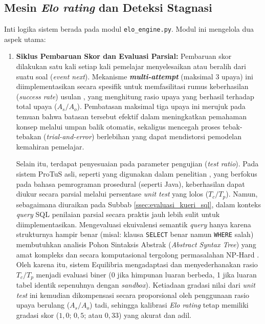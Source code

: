 \subsection{Mesin \textit{Elo rating} dan Deteksi Stagnasi}
Inti logika sistem berada pada modul \texttt{elo\_engine.py}. Modul ini mengelola dua aspek utama:
\begin{enumerate}
    \item \textbf{Siklus Pembaruan Skor dan Evaluasi Parsial:} Pembaruan skor dilakukan satu kali setiap kali pemelajar menyelesaikan atau beralih dari suatu soal (\textit{event next}). Mekanisme \textbf{\textit{multi-attempt}} (maksimal 3 upaya) ini diimplementasikan secara spesifik untuk memfasilitasi rumus keberhasilan (\textit{success rate}) usulan \textcite{Vesin2022}, yang menghitung rasio upaya yang berhasil terhadap total upaya ($A_s / A_o$). Pembatasan maksimal tiga upaya ini merujuk pada temuan \textcite{Mendoza2022} bahwa batasan tersebut efektif dalam meningkatkan pemahaman konsep melalui umpan balik otomatis, sekaligus mencegah proses tebak-tebakan (\textit{trial-and-error}) berlebihan yang dapat mendistorsi pemodelan kemahiran pemelajar.

    Selain itu, terdapat penyesuaian pada parameter pengujian (\textit{test ratio}). Pada sistem ProTuS asli, seperti yang digunakan dalam penelitian \textcite{Vesin2022}, yang berfokus pada bahasa pemrograman prosedural (seperti Java), keberhasilan dapat diukur secara parsial melalui persentase \textit{unit test} yang lolos ($T_c / T_p$). Namun, sebagaimana diuraikan pada Subbab \ref{ssec:evaluasi_kueri_sql}, dalam konteks \textit{query} SQL penilaian parsial secara praktis jauh lebih sulit untuk diimplementasikan. Mengevaluasi ekuivalensi semantik \textit{query} hanya karena strukturnya hampir benar (misal: klausa \texttt{SELECT} benar namun \texttt{WHERE} salah) membutuhkan analisis Pohon Sintaksis Abstrak (\textit{Abstract Syntax Tree}) yang amat kompleks dan secara komputasional tergolong permasalahan NP-Hard \autocite{Silberschatz2019}. Oleh karena itu, sistem Equilibria mengadaptasi dan menyederhanakan rasio $T_c / T_p$ menjadi evaluasi biner (0 jika himpunan luaran berbeda, 1 jika luaran tabel identik sepenuhnya dengan \textit{sandbox}). Ketiadaan gradasi nilai dari \textit{unit test} ini kemudian dikompensasi secara proporsional oleh penggunaan rasio upaya berulang ($A_s / A_o$) tadi, sehingga kalibrasi \textit{Elo rating} tetap memiliki gradasi skor ($1,0$; $0,5$; atau $0,33$) yang akurat dan adil.
    

\end{enumerate}
